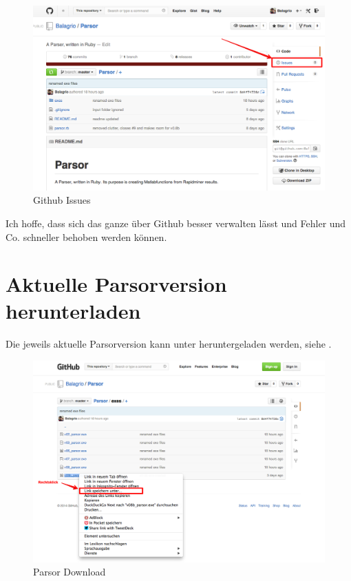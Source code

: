 \documentclass[12pt, a4paper]{scrartcl}
\begin{document}
\begin{figure}[H]
\centering %
\includegraphics[width=\textwidth]{fig/Issues.png} %
\caption{Github Issues} %
\label{fig:issues} %
\end{figure}

Ich hoffe, dass sich das ganze über Github besser verwalten lässt und Fehler und Co. schneller behoben werden können. 

\clearpage
\section{Aktuelle Parsorversion herunterladen}

Die jeweils aktuelle Parsorversion kann unter \cite{parsor} heruntergeladen werden, siehe . \\

\begin{figure}[H]
\centering %
\includegraphics[width=\textwidth]{fig/Speichern.png} %
\caption{Parsor Download} %
\label{fig:speichern} %
\end{figure}
\end{document}
